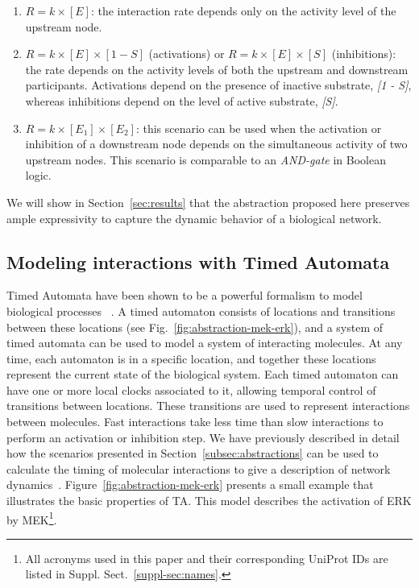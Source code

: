 \documentclass{bmcart}
\def\ta{Timed Automaton}
\def\tas{Timed Automata}
\begin{document}
\begin{enumerate}
  \item $R = k \times [E]$: the interaction rate depends only on the activity level of the upstream node.
  \item $R = k \times [E] \times [1 - S]$ (activations) or $R = k \times [E] \times [S]$ (inhibitions): the rate 
  depends on the activity levels of both the upstream and downstream participants. Activations depend on the 
  presence of inactive substrate, \emph{[1 - S]}, whereas inhibitions depend on the level of active substrate,
  \emph{[S]}.
  \item $R = k \times [E_1] \times [E_2]$: this scenario can be used when the activation or inhibition
  of a downstream node depends on the simultaneous activity of two upstream nodes. This scenario is comparable to an
  \emph{AND-gate} in Boolean logic.
\end{enumerate}
We will show in Section~\ref{sec:results} that the abstraction proposed here preserves ample
expressivity to capture the dynamic behavior of a biological network. 


\subsection*{Modeling interactions with Timed Automata}\label{subsec:timed-automata}
\def\ta{TA}
\def\tas{TA}

Timed Automata have been shown to be a powerful formalism to model biological processes
~\cite{ta-siebert,bartocci-oscillators,oded-ode-ta-discretization}. A timed automaton consists of locations
and transitions between these locations (see Fig.~\ref{fig:abstraction-mek-erk}), and a system of timed automata can be 
used to model a system of interacting molecules. At any time, each automaton is in a specific location, and together 
these locations represent the current state of the biological system. Each timed automaton can have one or more local clocks
associated to it, allowing temporal control of transitions between locations. These transitions are used to 
represent interactions between molecules. Fast interactions take less time than slow interactions 
to perform an activation or inhibition step. We have previously described in detail how the 
scenarios presented in Section~\ref{subsec:abstractions} can be used to calculate the timing of molecular 
interactions to give a description of network dynamics~\cite{animo-ieee}. Figure~\ref{fig:abstraction-mek-erk}
presents a small example that illustrates the basic properties of \tas. 
This model describes the activation of ERK by MEK\footnote{All acronyms used in this paper
and their corresponding UniProt IDs are listed in Suppl. Sect.~\ref{suppl-sec:names}.}.
\end{document}
